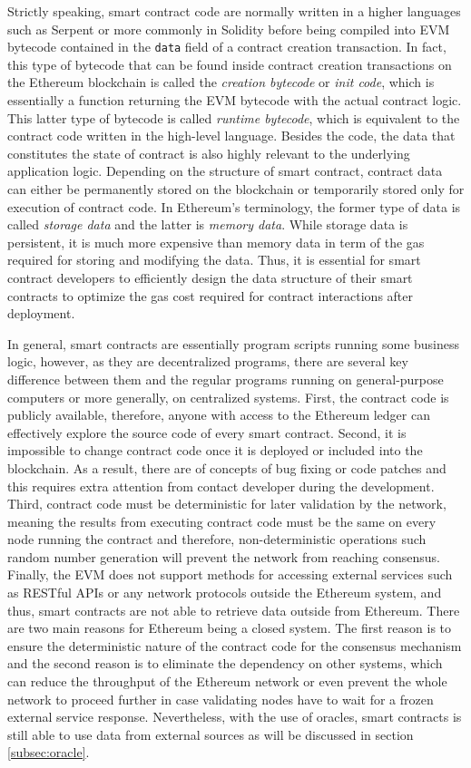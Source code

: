 Strictly speaking, smart contract code are normally written in a higher languages such as Serpent or more commonly in Solidity before being compiled into EVM bytecode contained in the \texttt{data} field of a contract creation transaction. In fact, this type of bytecode that can be found inside contract creation transactions on the Ethereum blockchain is called the \textit{creation bytecode} or \textit{init code}, which is essentially a function returning the EVM bytecode with the actual contract logic. This latter type of bytecode is called \textit{runtime bytecode}, which is equivalent to the contract code written in the high-level language. Besides the code, the data that constitutes the state of contract is also highly relevant to the underlying application logic. Depending on the structure of smart contract, contract data can either be permanently stored on the blockchain or temporarily stored only for execution of contract code. In Ethereum's terminology, the former type of data is called \textit{storage data} and the latter is \textit{memory data}. While storage data is persistent, it is much more expensive than memory data in term of the gas required for storing and modifying the data. Thus, it is essential for smart contract developers to efficiently design the data structure of their smart contracts to optimize the gas cost required for contract interactions after deployment.

In general, smart contracts are essentially program scripts running some business logic, however, as they are decentralized programs, there are several key difference between them and the regular programs running on general-purpose computers or more generally, on centralized systems. First, the contract code is publicly available, therefore, anyone with access to the Ethereum ledger can effectively explore the source code of every smart contract. Second, it is impossible to change contract code once it is deployed or included into the blockchain.  
As a result, there are of concepts of bug fixing or code patches and this requires extra attention from contact developer during the development. Third, contract code must be deterministic for later validation by the network, meaning the results from executing contract code must be the same on every node running the contract and therefore, non-deterministic operations such random number generation will prevent the network from reaching consensus. Finally, the EVM does not support methods for accessing external services such as RESTful APIs or any network protocols outside the Ethereum system, and thus, smart contracts are not able to retrieve data outside from Ethereum. There are two main reasons for Ethereum being a closed system. The first reason is to ensure the deterministic nature of the contract code for the consensus mechanism and the second reason is to eliminate the dependency on other systems, which can reduce the throughput of the Ethereum network or even prevent the whole network to proceed further in case validating nodes have to wait for a frozen external service response. Nevertheless, with the use of oracles, smart contracts is still able to use data from external sources as will be discussed in section \ref{subsec:oracle}.


